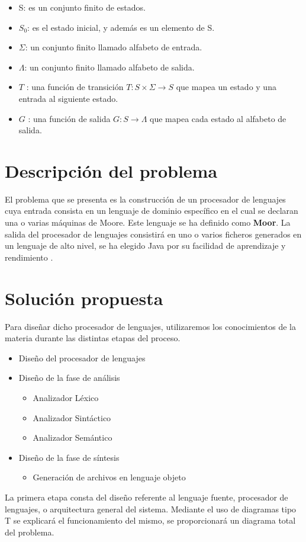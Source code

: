 \documentclass[12pt,a4paper]{article}
\begin{document}
	\begin{itemize}
		\item S: es un conjunto finito de estados.
		\item $S_{0}$: es el estado inicial, y además es un elemento de S.
		\item $\Sigma$: un conjunto finito llamado alfabeto de entrada.
		\item $\Lambda$: un conjunto finito llamado alfabeto de salida.
		\item $T$ : una función de transición $T: S \times \Sigma \rightarrow S$ que mapea un estado y una entrada al siguiente estado.
		\item $G$ : una función de salida $G : S \rightarrow \Lambda $ que mapea cada estado al alfabeto de salida.
	\end{itemize}
\clearpage

\newpage

\section{Descripción del problema}
El problema que se presenta es la construcción de un procesador de lenguajes cuya entrada consista en un lenguaje de dominio específico en el cual se declaran una o varias máquinas de Moore. Este lenguaje se ha definido como \textbf{Moor}. La salida del procesador de lenguajes consistirá en uno o varios ficheros generados en un lenguaje de alto nivel, se ha elegido Java por su facilidad de aprendizaje y rendimiento .

\section{Solución propuesta}
Para diseñar dicho procesador de lenguajes, utilizaremos los conocimientos de la materia durante las distintas etapas del proceso.

\begin{itemize}
	\item Diseño del procesador de lenguajes
	\item  Diseño de la fase de análisis \begin{itemize}
		\item Analizador Léxico
		\item Analizador Sintáctico
		\item Analizador Semántico	
	\end{itemize}
	\item Diseño de la fase de síntesis \begin{itemize}
		\item Generación de archivos en lenguaje objeto
	\end{itemize}
\end{itemize}
La primera etapa consta del diseño referente al lenguaje fuente, procesador de lenguajes, o arquitectura general del sistema. Mediante el uso de diagramas tipo T se explicará el funcionamiento del mismo, se proporcionará un diagrama total del problema.
\end{document}

